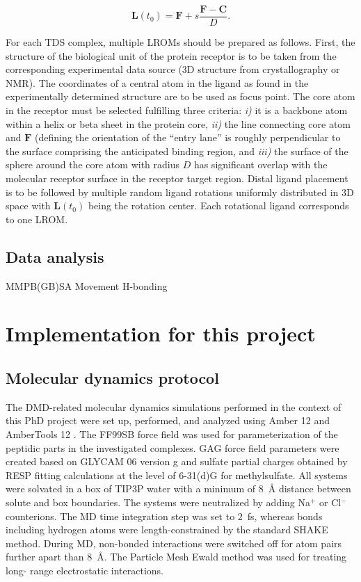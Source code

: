 \begin{equation}
\bm{L}(t_0) = \bm{F} + s \frac{\bm{F}-\bm{C}}{D}.
\end{equation}

For each TDS complex, multiple LROMs should be prepared as follows. First, the
structure of the biological unit of the protein receptor is to be taken from the
corresponding experimental data source (3D structure from crystallography or
NMR). The coordinates of a central atom in the ligand as found in the
experimentally determined structure are to be used as focus point. The core atom
in the receptor must be selected fulfilling three criteria: \textit{i)} it is a
backbone atom within a helix or beta sheet in the protein core, \textit{ii)} the
line connecting core atom and $\bm{F}$ (defining the orientation of the ``entry
lane'' is roughly perpendicular to the surface comprising the anticipated
binding region, and \textit{iii)} the surface of the sphere around the core atom
with radius $D$ has significant overlap with the molecular receptor surface in
the receptor target region. Distal ligand placement is to be followed by
multiple random ligand rotations uniformly distributed in 3D space with
$\bm{L}(t_0)$ being the rotation center. Each rotational ligand corresponds to
one LROM.

\subsection{Data analysis}
            MMPB(GB)SA
            Movement
            H-bonding
\hl{\lipsum[1-2]}



\section{Implementation for this project}

\subsection{Molecular dynamics protocol}

The DMD-related molecular dynamics simulations performed in the context of this
PhD project were set up, performed, and analyzed using Amber 12 and AmberTools
12 \cite{case_amber_11}. The FF99SB force field was used for parameterization of
the peptidic parts in the investigated complexes. GAG force field parameters
were created based on GLYCAM 06 version g \cite{kirschner_glycam06:_2008} and
sulfate partial charges obtained by RESP fitting calculations at the level of
6-31(d)G for methylsulfate. All systems were solvated in a box of TIP3P water
with a minimum of \SI{8}{\angstrom} distance between solute and box boundaries.
The systems were neutralized by adding Na$^{+}$ or Cl$^{-}$ counterions. The MD
time integration step was set to \SI{2}{\femto\second}, whereas bonds including
hydrogen atoms were length-constrained by the standard SHAKE method. During MD,
non-bonded interactions were switched off for atom pairs further apart than
\SI{8}{\angstrom}. The Particle Mesh Ewald method was used for treating long-
range electrostatic interactions.

